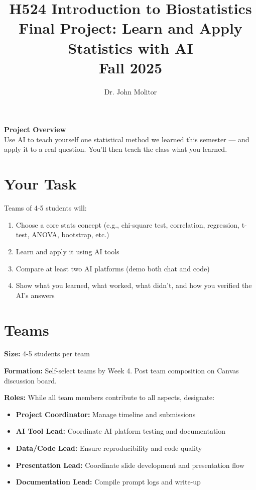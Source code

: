 \documentclass[11pt]{article}
\title{\textbf{H524 Introduction to Biostatistics\\
\Large Final Project: Learn and Apply Statistics with AI\\
Fall 2025}}
\author{Dr. John Molitor}
\date{}
\begin{document}
\maketitle

\begin{tcolorbox}[colback=aiblue!10,colframe=aiblue,boxrule=2pt,arc=2pt,left=6pt,right=6pt,top=6pt,bottom=6pt]
\centering
\textbf{\large Project Overview}\\[0.3em]
Use AI to teach yourself one statistical method we learned this semester — and apply it to a real question. You'll then teach the class what you learned.
\end{tcolorbox}

\section{Your Task}

Teams of 4-5 students will:

\begin{enumerate}
\item Choose a core stats concept (e.g., chi-square test, correlation, regression, t-test, ANOVA, bootstrap, etc.)
\item Learn and apply it using AI tools
\item Compare at least two AI platforms (demo both chat and code)
\item Show what you learned, what worked, what didn't, and how you verified the AI's answers
\end{enumerate}

\section{Teams}

\textbf{Size:} 4-5 students per team

\textbf{Formation:} Self-select teams by Week 4. Post team composition on Canvas discussion board.

\textbf{Roles:} While all team members contribute to all aspects, designate:
\begin{itemize}
\item \textbf{Project Coordinator:} Manage timeline and submissions
\item \textbf{AI Tool Lead:} Coordinate AI platform testing and documentation
\item \textbf{Data/Code Lead:} Ensure reproducibility and code quality
\item \textbf{Presentation Lead:} Coordinate slide development and presentation flow
\item \textbf{Documentation Lead:} Compile prompt logs and write-up
\end{itemize}
\end{document}
